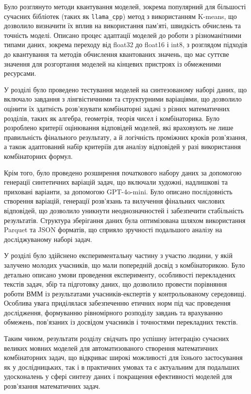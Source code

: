 Було розглянуто методи квантування моделей, зокрема популярний для більшості сучасних бібліотек (таких як \texttt{llama\_cpp}) метод з використанням K-means, що дозволило визначити їх вплив на використання пам’яті, швидкість обчислень та точність моделі. Описано процес адаптації моделей до роботи з різноманітними типами даних, зокрема переходу від float32 до float16 і int8, з розглядом підходів до квантування та методів обчислення квантованих значень, що має суттєве значення для розгортання моделей на кінцевих пристроях із обмеженими ресурсами.

У розділі було проведено тестування моделей на синтезованому наборі даних, що включало завдання з лінгвістичними та структурними варіаціями, що дозволило оцінити їх здатність розв’язувати комбінаторні задачі з різних математичних розділів, таких як алгебра, геометрія, теорія чисел і комбінаторика. Було розроблено критерії оцінювання відповідей моделей, які враховують не лише правильність фінального результату, а й логічність проміжних кроків розв’язання, а також адаптований набір критеріїв для аналізу відповідей у разі використання комбінаторних формул. 

Крім того, було проведено розширення початкового набору даних за допомогою генерації синтетичних варіацій задач, що включали художні, надлишкові та приховані варіанти, за допомогою GPT-4o-mini. Було описано послідовність створення варіацій, генерації розв’язань та вилучення фінальних числових відповідей, що дозволило уникнути неоднозначностей і забезпечити стабільність результатів. Структура зберігання даних була оптимізована шляхом використання Parquet та JSON форматів, що сприяло зручності подальшого аналізу на досліджуваному наборі задач. 

У розділі було здійснено експериментальну частину з участю людини, у якій залучено молодих учасників, що мали попередній досвід з комбінаторикою. Було детально описано умови проведення експерименту, особливості перекладених текстів задач, збір та підготовку даних, що дозволило провести порівняння роботи ВММ із результатами учасників-експертів у контрольованому середовищі. Особлива увага приділялася забезпеченню етичних норм під час проведення дослідження, формуванню рівномірного розподілу завдань та врахуванню обмежень, пов'язаних із досвідом учасників і точностями перекладних текстів.

Таким чином, результати розділу свідчать про успішну інтеграцію сучасних великих мовних моделей для автоматизованого створення математичних комбінаторних задач, що відкриває широкі можливості для їхнього застосування як у дослідницьких, так і в практичних умовах та є актуальним для подальших удосконалень у сфері синтезу даних і покращення ефективності моделей для розв’язання математичних задач.
